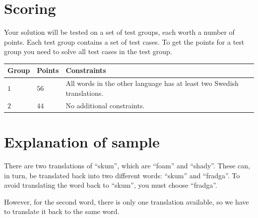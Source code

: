 \section*{Scoring}
Your solution will be tested on a set of test groups, each worth a number of points. Each test group contains
a set of test cases. To get the points for a test group you need to solve all test cases in the test group.

\noindent
\begin{tabular}{| l | l | p{12cm} |}
  \hline
  \textbf{Group} & \textbf{Points} & \textbf{Constraints} \\ \hline
  $1$    & $56$      & All words in the other language has at least two Swedish translations. \\ \hline
  $2$    & $44$      & No additional constraints. \\ \hline
\end{tabular}

\section*{Explanation of sample}
There are two translations of ``skum'', which are ``foam'' and ``shady''.
These can, in turn, be translated back into two different words: ``skum'' and ``fradga''.
To avoid translating the word back to ``skum'', you must choose ``fradga''.

However, for the second word, there is only one translation available, so we have to translate it back to the same word.

